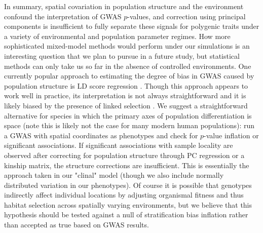 \documentclass[11pt,twoside,lineno]{preprint}
\newif\ifcomments
\newcommand{\cjb}[1]{\ifcomments{{\color{orange} \it (#1)}}\else{}\fi}
\begin{document}
In summary, spatial covariation in population structure and the environment confound the interpretation of GWAS $p$-values, and correction using principal components is insufficient to fully separate these signals for polygenic traits under a variety of environmental and population parameter regimes. How more sophisticated mixed-model methods would perform under our simulations is an interesting question that we plan to pursue in a future study, but statistical methods can only take us so far in the absence of controlled environments. One currently popular approach to estimating the degree of bias in GWAS caused by population structure is LD score regression \citep{Bulik-Sullivan2015}. Though this approach appears to work well in practice, its interpretation is not always straightforward and it is likely biased by the presence of linked selection \citep{Berg2018}. We suggest a straightforward alternative for species in which the primary axes of population differentiation is space (note this is likely not the case for many modern human populations): run a GWAS with spatial coordinates as phenotypes and check for $p$-value inflation or significant associations. If significant associations with sample locality are observed after correcting for population structure through PC regression or a kinship matrix, the structure corrections are insufficient. This is essentially the approach taken in our "clinal" model (though we also include normally distributed variation in our phenotypes). Of course it is possible that genotypes indirectly affect individual locations by adjusting organismal fitness and thus habitat selection across spatially varying environments, but we believe that this hypothesis should be tested against a null of stratification bias inflation rather than accepted as true based on GWAS results.  \cjb{what do you think of the second half here?}
\end{document}
